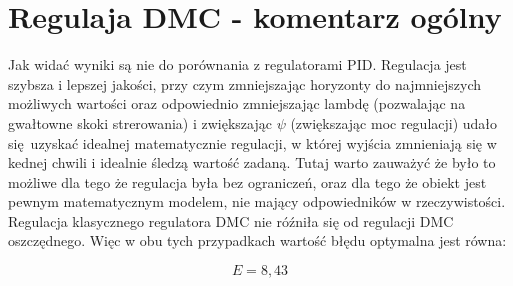 

\section{Regulaja DMC - komentarz ogólny}

Jak widać wyniki są nie do porównania z regulatorami PID. Regulacja jest szybsza i lepszej jakości, przy czym zmniejszając horyzonty do najmniejszych możliwych wartości oraz odpowiednio zmniejszając lambdę (pozwalając na gwałtowne skoki strerowania) i zwiększając $\psi$ (zwiększając moc regulacji) udało się uzyskać idealnej matematycznie regulacji, w której wyjścia zmnieniają się w kednej chwili i idealnie śledzą wartość zadaną. Tutaj warto zauważyć że było to możliwe dla tego że regulacja była bez ograniczeń, oraz dla tego że obiekt jest pewnym matematycznym modelem, nie mający odpowiedników w rzeczywistości. Regulacja klasycznego regulatora DMC nie róźniła się od regulacji DMC oszczędnego. Więc w obu tych przypadkach wartość błędu optymalna jest równa:

\begin{equation}
    E = 8,43
\end{equation}